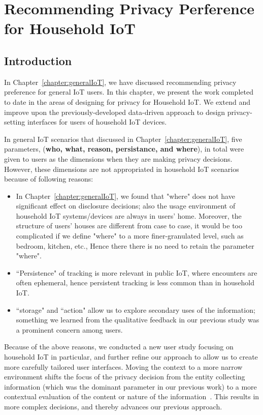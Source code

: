 \chapter{Recommending Privacy Perference for Household IoT}

\section{Introduction}
In Chapter~\ref{chapter:generalIoT}, we have discussed recommending privacy preference for general IoT users. In this chapter, we present the work completed to date in the areas of designing for privacy for Household IoT. We extend and improve upon the previously-developed data-driven approach to design privacy-setting interfaces for users of household IoT devices.

In general IoT scenarios that discussed in Chapter~\ref{chapter:generalIoT},  five parameters, (\textbf{who, what, reason, persistance, and where}), in total were given to users as the dimensions when they are making privacy decisions. However, these dimensions are not appropriated in household IoT scenarios because of following reasons:

\begin{itemize}
	\item In Chapter~\ref{chapter:generalIoT}, we found that "where" does not have significant effect on disclosure decisions; also the usage environment of household IoT systems/devices are always in users' home. Moreover, the structure of users' houses are different from case to case, it would be too complicated if we define "where" to a more finer-granulated level, such as bedroom, kitchen, etc.,  Hence there there is no need to retain the parameter "where".
	\item  ``Persistence" of tracking is more relevant in public IoT, where encounters are often ephemeral, hence persistent tracking is less common than in household IoT.
	\item ``storage" and ``action" allow us to explore secondary uses of the information; something we learned from the
	qualitative feedback in our previous study was a prominent concern among users.
\end{itemize}

Because of the above reasons, we conducted a new user study focusing on household IoT in particular, and further refine our approach to allow us to create more carefully tailored user interfaces. Moving the context to a more narrow environment shifts the focus of the privacy decision from the entity collecting information (which was the dominant parameter in our previous work) to a more contextual evaluation of the content or nature of the information~\cite{nissenbaum_privacy_2004}. This results in more complex decisions, and thereby advances our previous approach.

